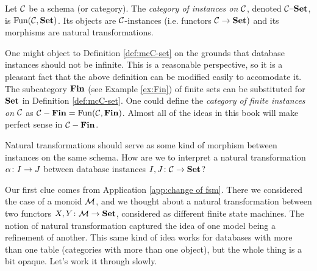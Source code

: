 \documentclass[CT4S-EN-RU]{subfiles}
\begin{document}
\begin{blockRUS}
\end{blockRUS}

\begin{definitionENG}\label{def:mcC-set}
Let $\mathcal{C}$ be a schema (or category). The {\em category of instances on $\mathcal{C}$}, denoted $\mathcal{C}{\text \textendash}{\bf Set}$, is $\textnormal{Fun}(\mathcal{C},{\bf Set})$. Its objects are $\mathcal{C}$-instances (i.e. functors $\mathcal{C}\rightarrow{\bf Set})$ and its morphisms are natural transformations.
\end{definitionENG}

\begin{definitionRUS}\label{def:mcC-set}
\end{definitionRUS}

\begin{remarkENG}
One might object to Definition \ref{def:mcC-set} on the grounds that database instances should not be infinite. This is a reasonable perspective, so it is a pleasant fact that the above definition can be modified easily to accomodate it. The subcategory ${\bf Fin}$ (see Example \ref{ex:Fin}) of finite sets can be substituted for ${\bf Set}$ in Definition \ref{def:mcC-set}. One could define the {\em category of finite instances on $\mathcal{C}$} as $\mathcal{C}-{\bf Fin}=\textnormal{Fun}(\mathcal{C},{\bf Fin})$. Almost all of the ideas in this book will make perfect sense in $\mathcal{C}-{\bf Fin}$.
\end{remarkENG}

\begin{remarkRUS}
\end{remarkRUS}

\begin{blockENG}
Natural transformations should serve as some kind of morphism between instances on the same schema. How are we to interpret a natural transformation $\alpha\colon I\rightarrow J$ between database instances $I,J\colon\mathcal{C}\rightarrow{\bf Set}$? 
\end{blockENG}

\begin{blockRUS}
\end{blockRUS}

\begin{blockENG}
Our first clue comes from Application \ref{app:change of fsm}. There we considered the case of a monoid $\mathcal{M}$, and we thought about a natural transformation between two functors $X,Y\colon\mathcal{M}\rightarrow{\bf Set}$, considered as different finite state machines. The notion of natural transformation captured the idea of one model being a refinement of another. This same kind of idea works for databases with more than one table (categories with more than one object), but the whole thing is a bit opaque. Let's work it through slowly.
\end{blockENG}
\end{document}
